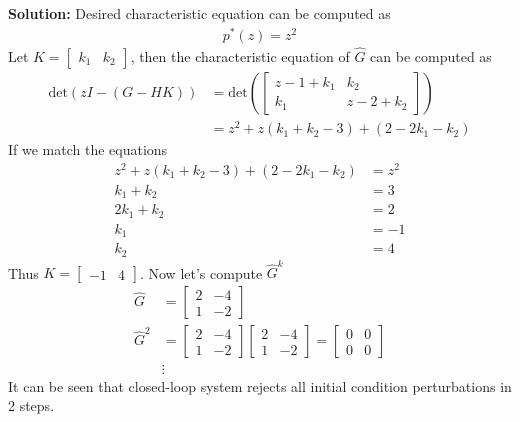 \documentclass[twoside]{article}
\begin{document}
\textbf{Solution:} Desired characteristic equation can be computed as
%
\begin{align*}
  p^*(z) = z^2
\end{align*}
%
Let $K = \left[ \begin{array}{cc} k_1 & k_2 \end{array} \right]$, then
the characteristic equation of $\hat{G}$ can be computed as
%
\begin{align*}
  \mathrm{det} \left( z I - ( G - H K ) \right) &= 
  \mathrm{det} \left(
  \left[ \begin{array}{cc} z - 1 + k_1 & k_2 \\ k_1 & z - 2 + k_2 \end{array} \right]
  \right)
\\
&= z^2 + z (k_1 + k_2 - 3) + (2 -2 k_1 - k_2)
\end{align*}
%
If we match the equations
%
\begin{align*}
z^2 + z (k_1 + k_2 - 3) + (2 -2 k_1 - k_2) &= z^2
\\
k_1 + k_2 &= 3
\\
2k_1 + k_2 &= 2
\\
k_1 &= -1
\\
k_2 &= 4
\end{align*}
%
Thus $K = \left[ \begin{array}{cc} -1 & 4 \end{array} \right]$.
Now let's compute $\hat{G}^k$ 
%
\begin{align*}
\hat{G} &= \left[ \begin{array}{cc} 2 & -4 \\ 1 & -2 \end{array} \right] 
\\
\hat{G}^2 &= \left[ \begin{array}{cc} 2 & -4 \\ 1 & -2 \end{array} \right] 
\left[ \begin{array}{cc} 2 & -4 \\ 1 & -2 \end{array} \right] = 
\left[ \begin{array}{cc} 0 & 0 \\ 0 & 0 \end{array} \right]
\\
&\vdots
\end{align*}
%
It can be seen that closed-loop system rejects all initial condition
perturbations in 2 steps. 



\end{document}
